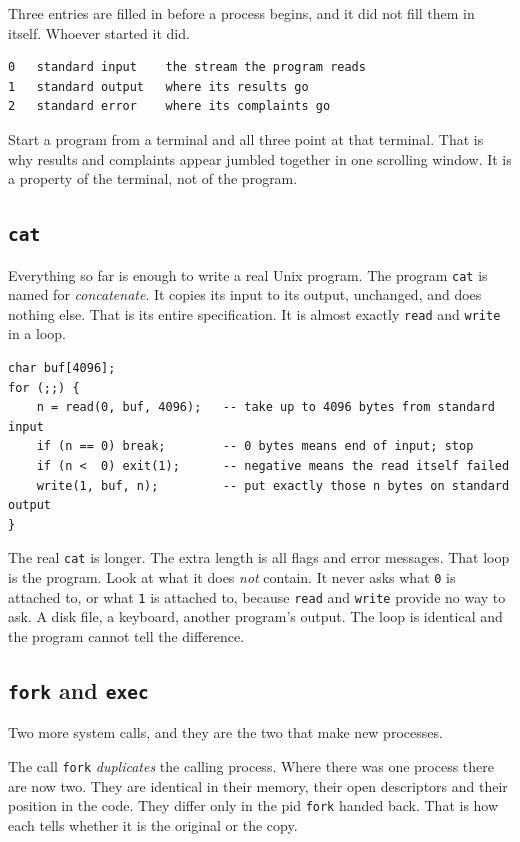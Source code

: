 \documentclass[11pt,a4paper]{article}
\begin{document}
Three entries are filled in before a process begins, and it did not fill them in itself. Whoever
started it did.

\begin{lstlisting}[language=SH]
0   standard input    the stream the program reads
1   standard output   where its results go
2   standard error    where its complaints go
\end{lstlisting}

Start a program from a terminal and all three point at that terminal. That is why results and
complaints appear jumbled together in one scrolling window. It is a property of the terminal, not
of the program.

\subsection{\texttt{cat}}

Everything so far is enough to write a real Unix program. The program \texttt{cat} is named for
\emph{concatenate}. It copies its input to its output, unchanged, and does nothing else. That is
its entire specification. It is almost exactly \texttt{read} and \texttt{write} in a loop.

\begin{lstlisting}[language=SH]
char buf[4096];
for (;;) {
    n = read(0, buf, 4096);   -- take up to 4096 bytes from standard input
    if (n == 0) break;        -- 0 bytes means end of input; stop
    if (n <  0) exit(1);      -- negative means the read itself failed
    write(1, buf, n);         -- put exactly those n bytes on standard output
}
\end{lstlisting}

The real \texttt{cat} is longer. The extra length is all flags and error messages. That loop is
the program. Look at what it does \emph{not} contain. It never asks what \texttt{0} is attached to,
or what \texttt{1} is attached to, because \texttt{read} and \texttt{write} provide no way to ask.
A disk file, a keyboard, another program's output. The loop is identical and the program cannot
tell the difference.

\subsection{\texttt{fork} and \texttt{exec}}

Two more system calls, and they are the two that make new processes.

The call \texttt{fork} \emph{duplicates} the calling process. Where there was one process there are now
two. They are identical in their memory, their open descriptors and their position in the code.
They differ only in the pid \texttt{fork} handed back. That is how each tells whether it is the
original or the copy.
\end{document}

